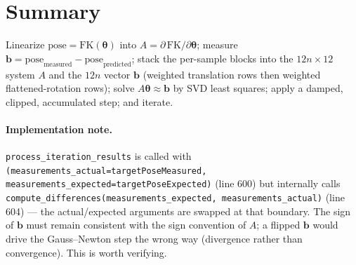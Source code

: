 \documentclass[11pt]{article}
\begin{document}
\section*{Summary}
Linearize $\text{pose} = \mathrm{FK}(\bm{\theta})$ into $A = \partial\,\mathrm{FK}/\partial\bm{\theta}$;
measure $\bm{b} = \text{pose}_{\text{measured}} - \text{pose}_{\text{predicted}}$;
stack the per-sample blocks into the $12n \times 12$ system $A$ and the $12n$ vector
$\bm{b}$ (weighted translation rows then weighted flattened-rotation rows); solve
$A\bm{\theta}\approx\bm{b}$ by SVD least squares; apply a damped, clipped,
accumulated step; and iterate.

\paragraph{Implementation note.}
\texttt{process\_iteration\_results} is called with
\texttt{(measurements\_actual=targetPoseMeasured, measurements\_expected=targetPoseExpected)}
(line 600) but internally calls
\texttt{compute\_differences(measurements\_expected, measurements\_actual)}
(line 604) --- the actual/expected arguments are swapped at that boundary. The sign
of $\bm{b}$ must remain consistent with the sign convention of $A$; a flipped $\bm{b}$
would drive the Gauss--Newton step the wrong way (divergence rather than
convergence). This is worth verifying.
\end{document}
